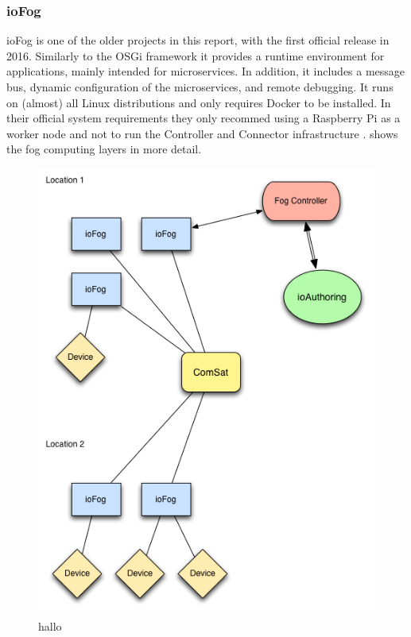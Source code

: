 \subsubsection{ioFog}
ioFog is one of the older projects in this report, with the first official release in 2016\cite{ioFogMainBlog:online}. Similarly to the OSGi framework it provides a runtime environment for applications, mainly intended for microservices. In addition, it includes a message bus, dynamic configuration of the microservices, and remote debugging\cite{ioFogMainBlog:online}. It runs on (almost) all Linux distributions and only requires Docker to be installed. In their official system requirements they only recommed using a Raspberry Pi as a worker node and not to run the Controller and Connector infrastructure \cite{ioFOgQuickStart:online}.
 shows the fog computing layers in more detail.
\begin{figure}[h!]
    \centering
    \includegraphics[scale=0.4]{figures/ioFog-Component_Diagram.png}
    \caption{hallo}
    \label{fig:ioFogComponent}
\end{figure}\\
